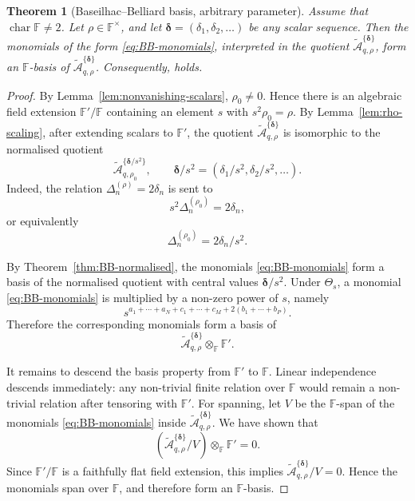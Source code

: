 \documentclass[11pt]{extarticle}
\newtheorem{theorem}{Theorem}[section]
\theoremstyle{definition}
\theoremstyle{remark}
\numberwithin{equation}{section}
\newcommand{\F}{\mathbb F}
\newcommand{\BBqquot}[2]{\widetilde{\mathcal A}_{q,#1}^{\{#2\}}}
\begin{document}
\begin{theorem}[Baseilhac--Belliard basis, arbitrary parameter]
\label{thm:BB-general}
Assume that \(\operatorname{char}\F\neq2\).  Let
\(\rho\in\F^\times\), and let
\(\boldsymbol\delta=(\delta_1,\delta_2,\ldots)\) be any scalar sequence.
Then the monomials of the form \eqref{eq:BB-monomials}, interpreted in the
quotient \(\BBqquot{\rho}{\boldsymbol\delta}\), form an \(\F\)-basis of
\(\BBqquot{\rho}{\boldsymbol\delta}\).  Consequently,
\cite[Conjecture~1]{BaseilhacBelliard2017} holds.
\end{theorem}

\begin{proof}
By Lemma~\ref{lem:nonvanishing-scalars}, $\rho_0\neq0$.  Hence there is
an algebraic field extension $\F'/\F$ containing an element $s$ with
$s^2\rho_0=\rho$.  By Lemma~\ref{lem:rho-scaling}, after extending
scalars to \(\F'\), the quotient
\(\BBqquot{\rho}{\boldsymbol\delta}\) is isomorphic to the normalised
quotient
\[
        \BBqquot{\rho_0}{\boldsymbol\delta/s^2},
        \qquad
        \boldsymbol\delta/s^2
        =
        (\delta_1/s^2,\delta_2/s^2,\ldots).
\]
Indeed, the relation
\(\Delta_n^{(\rho)}=2\delta_n\) is sent to
\[
        s^2\Delta_n^{(\rho_0)}=2\delta_n,
\]
or equivalently
\[
        \Delta_n^{(\rho_0)}=2\delta_n/s^2.
\]

By Theorem~\ref{thm:BB-normalised}, the monomials
\eqref{eq:BB-monomials} form a basis of the normalised quotient with central
values \(\boldsymbol\delta/s^2\).  Under \(\Theta_s\), a monomial
\eqref{eq:BB-monomials} is multiplied by a non-zero power of \(s\), namely
\[
        s^{a_1+\cdots+a_N+c_1+\cdots+c_M
          +2(b_1+\cdots+b_P)}.
\]
Therefore the corresponding monomials form a basis of
\[
        \BBqquot{\rho}{\boldsymbol\delta}\otimes_\F\F' .
\]

It remains to descend the basis property from \(\F'\) to \(\F\).  Linear
independence descends immediately: any non-trivial finite relation over
\(\F\) would remain a non-trivial relation after tensoring with \(\F'\).
For spanning, let \(V\) be the \(\F\)-span of the monomials
\eqref{eq:BB-monomials} inside \(\BBqquot{\rho}{\boldsymbol\delta}\).  We
have shown that
\[
        ( \BBqquot{\rho}{\boldsymbol\delta}/V )
        \otimes_\F \F' =0 .
\]
Since \(\F'/\F\) is a faithfully flat field extension, this implies
\(\BBqquot{\rho}{\boldsymbol\delta}/V=0\).  Hence the monomials span over
\(\F\), and therefore form an \(\F\)-basis.
\end{proof}
\end{document}

